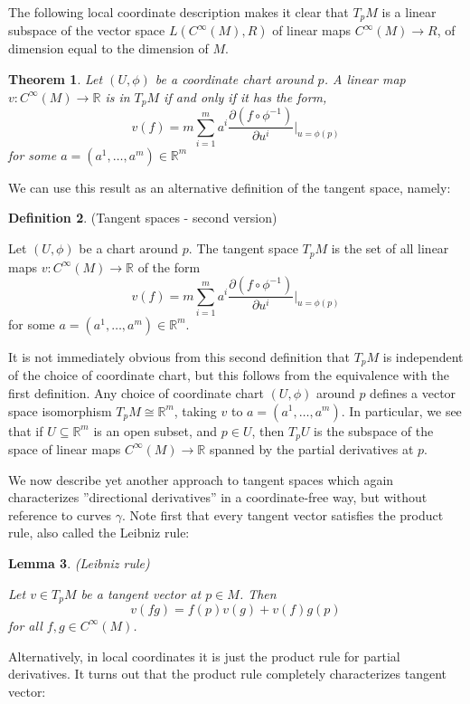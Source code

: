 \documentclass{article}
\newtheorem{theorem}{Theorem}[section]
\newtheorem{lemma}[theorem]{Lemma}
\theoremstyle{definition}
\newtheorem{defn}[theorem]{Definition}
\newenvironment{definition}
  {\vspace{8pt}\begin{mdframed}[backgroundcolor=blueish]\begin{defn}}
  {\end{defn}\end{mdframed}\vspace{4pt}}
\begin{document}
The following local coordinate description makes it clear that $T_pM$ is a linear subspace of the vector space $L(C^\infty(M),R)$ of linear maps $C^\infty(M) \rightarrow R$, of dimension equal to the dimension of $M$.

\begin{theorem}
Let $(U,\phi)$ be a coordinate chart around $p$. A linear map $v : C^\infty(M) \rightarrow \mathbb R$ is in $T_pM$ if and only if it has the form, 
\[
    v(f) = m \sum_{i=1}^m a^i \frac{\partial (f \circ \phi^{-1} )}{ \partial u^i}\Bigr|_{u = \phi(p)}
\]
for some $a = (a^1 ,\dots,a^m) \in \mathbb R^m$
\end{theorem}

We can use this result as an alternative definition of the tangent space, namely:

\begin{definition} (Tangent spaces - second version)


Let $(U,\phi)$ be a chart around $p$. The tangent space $T_pM$ is the set of all linear maps $v : C^\infty(M) \rightarrow \mathbb R$ of the form 
\[
     v(f) = m \sum_{i=1}^m a^i \frac{\partial (f \circ \phi^{-1} )}{ \partial u^i}\Bigr|_{u = \phi(p)} 
\]
for some $a = (a^1 ,\dots,a^m) \in \mathbb R^m$.
\end{definition}

It is not immediately obvious from this second definition that $T_pM$ is independent of the choice of coordinate chart, but this follows from the equivalence with the first definition. Any choice of coordinate chart $(U,\phi)$ around $p$ defines a vector space isomorphism $T_pM \cong \mathbb R^m$, taking $v$ to $a = (a^1 ,\dots,a^m)$. In particular, we see that if $U \subseteq \mathbb R^m$ is an open subset, and $p \in U$, then $T_pU$ is the subspace of the space of linear maps $C^\infty(M) \rightarrow \mathbb R$ spanned by the partial derivatives at $p$.

We now describe yet another approach to tangent spaces which again characterizes ''directional derivatives'' in a coordinate-free way, but without reference to curves $\gamma$. Note first that every tangent vector satisfies the product rule, also called the Leibniz rule:
\begin{lemma} (Leibniz rule)

Let $v \in T_pM$ be a tangent vector at $p \in M$. Then 
\[ 
    v(f g) = f(p) v(g) +v(f)g(p) 
\]
for all $f,g \in C ^\infty(M)$.
\end{lemma}
Alternatively, in local coordinates it is just the product rule for partial derivatives. It turns out that the product rule completely characterizes tangent vector:
\end{document}
